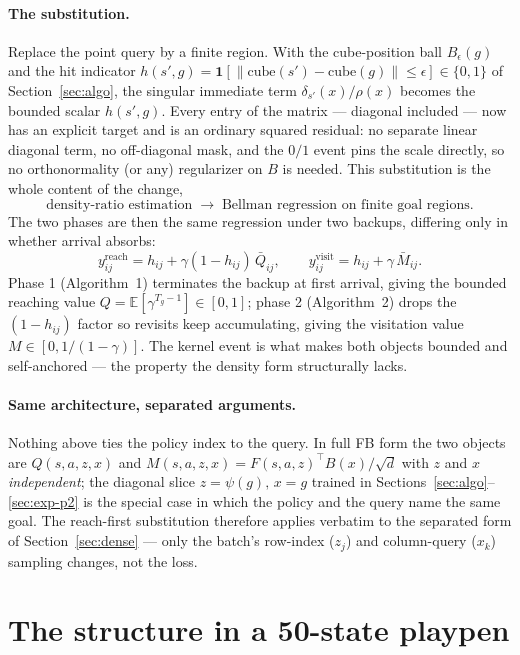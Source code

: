 \documentclass[10pt]{article}
\newcommand{\E}{\mathbb{E}}
\newcommand{\ind}[1]{\mathbf{1}\!\left[#1\right]}
\begin{document}
\paragraph{The substitution.}
Replace the point query by a finite region.
With the cube-position ball $B_\epsilon(g)$ and the hit indicator
$h(s',g)=\ind{\|\mathrm{cube}(s')-\mathrm{cube}(g)\|\le\epsilon}\in\{0,1\}$ of
Section~\ref{sec:algo}, the singular immediate term $\delta_{s'}(x)/\rho(x)$ becomes the
bounded scalar $h(s',g)$.
Every entry of the matrix --- diagonal included --- now has an explicit target and is an
ordinary squared residual: no separate linear diagonal term, no off-diagonal mask, and the
$0/1$ event pins the scale directly, so no orthonormality (or any) regularizer on $B$ is
needed.
This substitution is the whole content of the change,
\[
\text{density-ratio estimation}
\;\longrightarrow\;
\text{Bellman regression on finite goal regions}.
\]
The two phases are then the same regression under two backups, differing only in whether
arrival absorbs:
\[
y^{\mathrm{reach}}_{ij}=h_{ij}+\gamma(1-h_{ij})\,\bar Q_{ij},
\qquad
y^{\mathrm{visit}}_{ij}=h_{ij}+\gamma\,\bar M_{ij}.
\]
Phase 1 (Algorithm~1) terminates the backup at first arrival, giving the bounded reaching
value $Q=\E[\gamma^{T_g-1}]\in[0,1]$; phase 2 (Algorithm~2) drops the $(1-h_{ij})$ factor
so revisits keep accumulating, giving the visitation value $M\in[0,1/(1-\gamma)]$.
The kernel event is what makes both objects bounded and self-anchored --- the property the
density form structurally lacks.

\paragraph{Same architecture, separated arguments.}
Nothing above ties the policy index to the query.
In full FB form the two objects are $Q(s,a,z,x)$ and
$M(s,a,z,x)=F(s,a,z)^{\top}B(x)/\sqrt d$ with $z$ and $x$ \emph{independent};
the diagonal slice $z=\psi(g),\,x=g$ trained in
Sections~\ref{sec:algo}--\ref{sec:exp-p2} is the special case in which the policy and the
query name the same goal.
The reach-first substitution therefore applies verbatim to the separated form of
Section~\ref{sec:dense} --- only the batch's row-index ($z_j$) and column-query ($x_k$)
sampling changes, not the loss.

\section{The structure in a 50-state playpen}
\label{sec:playpen}
\end{document}
